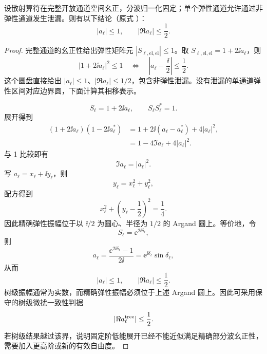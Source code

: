 \begin{proposition}[分波幺正约束]
设散射算符在完整开放通道空间幺正，分波归一化固定；单个弹性通道允许通过非弹性通道发生泄漏。则有以下结论（原式 ）：
\begin{equation*}
 \boxed{
 |a_\ell|\le1,
 \qquad
 |\Re a_\ell|\le\frac12.}
\end{equation*}
\end{proposition}
\begin{proof}
完整通道的幺正性给出弹性矩阵元 $|S_{\ell,\mathrm{el},\mathrm{el}}|\le1$。取 $S_{\ell,\mathrm{el},\mathrm{el}}=1+2\ii a_\ell$，则
\[
|1+2\ii a_\ell|^2\le1
\quad\Longleftrightarrow\quad
\left|a_\ell-\frac{\ii}{2}\right|\le\frac12.
\]
这个圆盘直接给出 $|a_\ell|\le1$、$|\Re a_\ell|\le1/2$，包含非弹性泄漏。没有泄漏的单通道弹性区间对应边界圆，下面计算其相移表示。

\begin{equation*}
 S_\ell=1+2\ii a_\ell,
 \qquad
 S_\ell S_\ell^*=1.
\end{equation*}
展开得到
\begin{align*}
 (1+2\ii a_\ell)(1-2\ii a_\ell^*)
 &=1+2\ii(a_\ell-a_\ell^*)+4|a_\ell|^2,\\
 &=1-4\Im a_\ell+4|a_\ell|^2.
\end{align*}
与 1 比较即有
\begin{equation*}
 \Im a_\ell=|a_\ell|^2.
\end{equation*}
写 \(a_\ell=x_\ell+\ii y_\ell\)，则
\begin{equation*}
 y_\ell=x_\ell^2+y_\ell^2,
\end{equation*}
配方得到
\begin{equation*}
 x_\ell^2+\left(y_\ell-\frac12\right)^2=\frac14.
\end{equation*}
因此精确弹性振幅位于以 \(\ii/2\) 为圆心、半径为 \(1/2\) 的 Argand 圆上。等价地，令
\begin{equation*}
 S_\ell=\ee^{2\ii\delta_\ell},
\end{equation*}
则
\begin{equation*}
 a_\ell
 =\frac{\ee^{2\ii\delta_\ell}-1}{2\ii}
 =\ee^{\ii\delta_\ell}\sin\delta_\ell,
\end{equation*}
从而
\begin{equation*}
 |a_\ell|\le1,
 \qquad
 |\Re a_\ell|\le\frac12.
\end{equation*}
树级振幅通常为实数，而精确弹性振幅必须位于上述 Argand 圆上。因此可采用保守的树级微扰一致性判据
\begin{equation*}
|\Re a_\ell^{\rm tree}|\le\frac12.
\end{equation*}
若树级结果越过该界，说明固定阶低能展开已经不能近似满足精确部分波幺正性，需要加入更高阶或新的有效自由度。
\end{proof}


